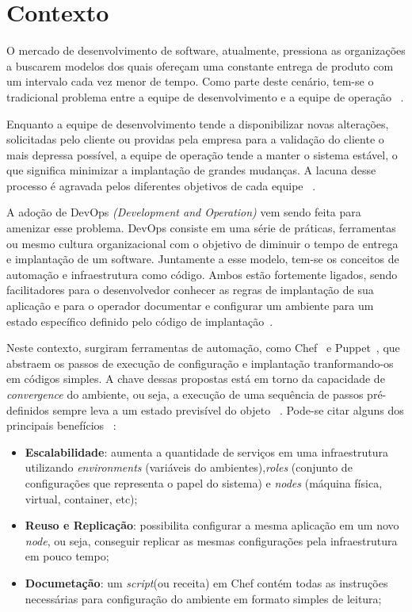 \section{Contexto}
\label{sec:contexto}

O mercado de desenvolvimento de software, atualmente, pressiona as organizações
a buscarem modelos dos quais ofereçam uma constante entrega de produto com
um intervalo cada vez menor de tempo. Como parte deste cenário, tem-se o
tradicional problema entre a equipe de desenvolvimento e a equipe de operação
~\cite{hummer:2013}.

Enquanto a equipe de desenvolvimento tende a disponibilizar novas alterações,
solicitadas pelo cliente ou providas pela empresa para a validação do cliente o
mais depressa possível, a equipe de operação tende a manter o sistema estável,
o que significa minimizar a implantação de grandes mudanças. A lacuna desse
processo é agravada pelos diferentes objetivos de cada equipe
~\cite{huttermann:2012}.

A adoção de DevOps \textit{(Development and Operation)} vem sendo feita
para amenizar esse problema. DevOps consiste em uma série de práticas,
ferramentas ou mesmo cultura organizacional com o objetivo de diminuir o tempo
de entrega e implantação de um software. Juntamente a esse modelo,
tem-se os conceitos de automação e infraestrutura
como código. Ambos estão fortemente ligados, sendo facilitadores para o
desenvolvedor conhecer as regras de implantação de sua aplicação
e para o operador documentar e configurar um ambiente para um estado específico
definido pelo código de implantação~\cite{hummer:2013}.

Neste contexto, surgiram ferramentas de automação, como Chef~\cite{chef:2016} e
Puppet~\cite{puppet:2016}, que abstraem os passos de execução de configuração
e implantação tranformando-os em códigos simples. A chave dessas propostas está em torno
da capacidade de \textit{convergence} do ambiente, ou seja, a execução de uma
sequência de passos pré-definidos sempre leva a um estado previsível do objeto
~\cite{hummer:2013}. Pode-se citar alguns dos principais benefícios
~\cite{vasiliev:2014}:

\begin{itemize}
  \item \textbf{Escalabilidade}: aumenta a quantidade de serviços em uma infraestrutura
    utilizando \textit{environments} (variáveis do ambientes),\textit{roles}
    (conjunto de configurações que representa o papel do sistema) e \textit{nodes}
    (máquina física, virtual, container, etc);
  \item \textbf{Reuso e Replicação}: possibilita configurar a mesma aplicação em um novo \textit{node}, ou seja,
    conseguir replicar as mesmas configurações pela infraestrutura em pouco tempo;
  \item \textbf{Documetação}: um \textit{script}(ou receita) em Chef contém todas as instruções necessárias
    para configuração do ambiente em formato simples de leitura;
\end{itemize}

